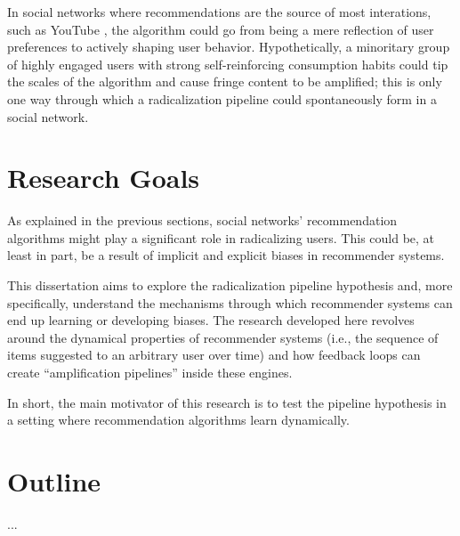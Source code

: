 In social networks where recommendations are the source of most interations,
such as YouTube \citep{}, the algorithm could go from being a mere reflection of
user preferences to actively shaping user behavior. Hypothetically, a minoritary
group of highly engaged users with strong self-reinforcing consumption habits
could tip the scales of the algorithm and cause fringe content to be amplified;
this is only one way through which a radicalization pipeline could spontaneously
form in a social network.

\section{Research Goals}
\label{sec:research_goals}

As explained in the previous sections, social networks' recommendation
algorithms might play a significant role in radicalizing users. This could be,
at least in part, be a result of implicit and explicit biases in recommender
systems.

This dissertation aims to explore the radicalization pipeline hypothesis and,
more specifically, understand the mechanisms through which recommender systems
can end up learning or developing biases. The research developed here revolves
around the dynamical properties of recommender systems (i.e., the sequence of
items suggested to an arbitrary user over time) and how feedback loops can
create ``amplification pipelines'' inside these engines.

In short, the main motivator of this research is to test the pipeline hypothesis
in a setting where recommendation algorithms learn dynamically.

\section{Outline}
\label{sec:outline}

...
